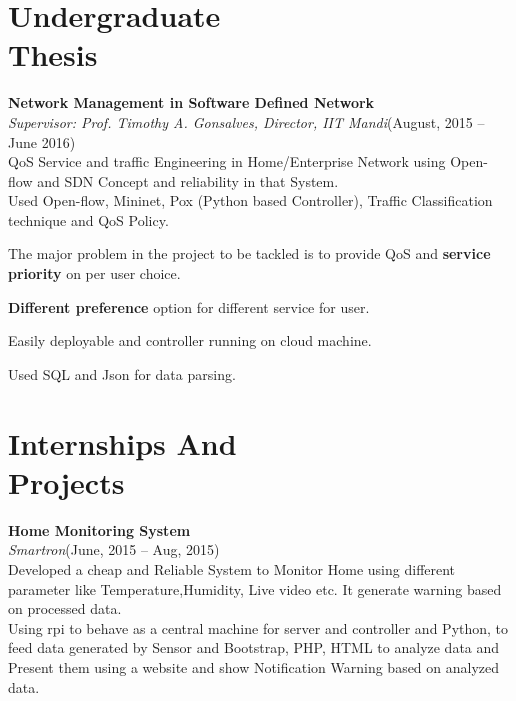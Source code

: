 \documentclass[a4paper,margin,line]{resume}
\begin{document}
\begin{resume}
	\section{\mysidestyle Undergraduate\\Thesis}
	\textbf{Network Management in Software Defined Network}\vspace{0.5mm}\\%
	\textsl{Supervisor: Prof. Timothy A. Gonsalves, Director, IIT Mandi}\hfill(August, 2015 -- June 2016)\vspace{1mm}\\%
	QoS Service and traffic Engineering in Home/Enterprise Network using Open-flow and SDN Concept and  reliability in that System.\\  Used Open-flow,  Mininet,  Pox  (Python based Controller),  Traffic  Classification  technique  and  QoS Policy.	
	\begin{list2}
	\item The major problem in the project to be tackled is to provide QoS and \textbf{service priority} on per user choice.
	\item \textbf{Different preference} option for different service for user.
	\item Easily deployable and controller running on cloud machine.
	\item Used SQL and Json for data parsing.
	\end{list2}
	\section{\mysidestyle Internships And\\Projects}

	\textbf{Home Monitoring System}\vspace{0.5mm}\\
	\textsl{Smartron}\hfill(June, 2015 -- Aug, 2015)\vspace{1mm}\\
	Developed a cheap and Reliable System to Monitor Home using different parameter like Temperature,Humidity, Live video etc.  It generate warning based on processed data.\\
	Using rpi to behave as a central machine for server and controller and Python, to feed data generated by  Sensor  and  Bootstrap,  PHP,  HTML  to  analyze  data  and  Present  them  using  a website and show Notification Warning based on analyzed data.


\end{resume}
\end{document}
